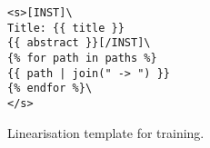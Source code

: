 \begin{figure}[h]
    \centering
    \begin{lstlisting}[frame=single]
<s>[INST]\
Title: {{ title }}
{{ abstract }}[/INST]\
{% for path in paths %}
{{ path | join(" -> ") }}
{% endfor %}\
</s>
\end{lstlisting}
    \caption{Linearisation template for \name training.}
    \label{fig:linearisation-template}
\end{figure}
